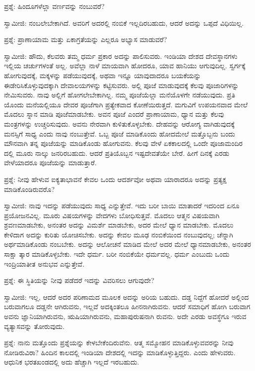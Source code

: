ಪ್ರಶ್ನೆ: ಹಿಂದೂಗಳೆಲ್ಲಾ ವರ್ಣವನ್ನು ನಂಬುವರೆ?

ಸ್ವಾಮೀಜಿ: ನಂಬಲೇಬೇಕಾಗಿದೆ. ಅವರಿಗೆ ಅದರಲ್ಲಿ ನಂಬಿಕೆ ಇಲ್ಲದಿರಬಹುದು, ಆದರೆ ಅದನ್ನು ಒಪ್ಪದೆ ವಿಧಿಯಿಲ್ಲ.

ಪ್ರಶ್ನೆ: ಪ್ರಾಣಾಯಾಮ ಮತ್ತು ಏಕಾಗ್ರತೆಯನ್ನು ಎಲ್ಲರೂ ಅಭ್ಯಾಸ ಮಾಡುವರೆ?

ಸ್ವಾಮೀಜಿ: ಹೌದು, ಕೆಲವರು ತಮ್ಮ ಧರ್ಮ ಪ್ರಕಾರ ಅದನ್ನು ಪಾಲಿಸುವರು. ಇಂಡಿಯಾ ದೇಶದ ದೇವಸ್ಥಾನಗಳು ಇಲ್ಲಿಯ ಚರ್ಚುಗಳಂತೆ ಅಲ್ಲ. ಅವೆಲ್ಲಾ ನಾಳೆ ಮಾಯವಾಗಿ ಹೋದರೂ, ಯಾವ ಹಾನಿಯು ಆಗುವುದಿಲ್ಲ. ಸ್ವರ್ಗಕ್ಕೆ ಹೋಗುವುದಕ್ಕೆ, ಮಕ್ಕಳನ್ನು ಪಡೆಯುವುದಕ್ಕೆ, ಅಥವಾ ಇನ್ನೂ ಯಾವುದಾದರೂ ಬಯಕೆಯನ್ನು ಈಡೇರಿಸಿಕೊಳ್ಳುವುದಕ್ಕಾಗಿ ದೇವಾಲಯಗಳನ್ನು ಕಟ್ಟಿಸುವರು. ಅಲ್ಲಿ ಪೂಜೆ ಮಾಡುವುದಕ್ಕೆ ಕೆಲವು ಪೂಜಾರಿಗಳನ್ನು ನೇಮಿಸುವರು. ನಾವು ಅಲ್ಲಿಗೆ ಹೋಗಲೇಬೇಕಾಗಿಲ್ಲ. ನಮ್ಮ ಪೂಜೆಯೆಲ್ಲಾ ಮನೆಯೊಳಗೇ ನಡೆಯುವುದು. ಪ್ರತಿ ಯೊಂದು ಮನೆಯಲ್ಲಿಯೂ ದೇವರ ಪೂಜೆಗಾಗಿ ಪ್ರತ್ಯೇಕವಾದ ಕೋಣೆಯಿರುತ್ತದೆ. ಮಗುವಿಗೆ ಉಪಯನವಾದ ಮೇಲೆ ಮೊದಲು ಸ್ನಾನ ಮಾಡಿ ಪೂಜೆಮಾಡಬೇಕು. ಅವನ ಪೂಜೆ ಎಂದರೆ ಪ್ರಾಣಾಯಾಮ, ಧ್ಯಾನ ಮತ್ತು ಕೆಲವು ಮಂತ್ರಗಳನ್ನು ಉಚ್ಚರಿಸುವುದು. ಅವನು ನೇರವಾಗಿ ಕುಳಿತುಕೊಳ್ಳಬೇಕು. ದೇಹವನ್ನು ಆರೋಗ್ಯ ವಾಗಿಡುವುದಕ್ಕೆ ಮನಸ್ಸಿಗೆ ಸಾಧ್ಯ ಎಂದು ನಾವು ನಂಬುತ್ತೇವೆ. ಒಬ್ಬ ಪೂಜೆ ಮಾಡಿಕೊಂದು ಹೋದಮೇಲೆ ಮತ್ತೊಬ್ಬನು ಬಂದು ಮೌನವಾಗಿ ತನ್ನ ಪೂಜೆಯನ್ನು ಮಾಡಿಕೊಂಡು ಹೋಗುವನು. ಕೆಲವು ವೇಳೆ ಏಕಕಾಲದಲ್ಲಿ ಒಂದೇ ಪೂಜಾಮಂದಿರ ದಲ್ಲಿ ಮೂರು ನಾಲ್ಕು ಜನರಿರಬಹುದು. ಆದರೆ ಪ್ರತಿಯೊಬ್ಬನ ಇಷ್ಟದೇವತೆಯೇ ಬೇರೆ. ಹೀಗೆ ದಿನಕ್ಕೆ ಎರಡು ವೇಳೆಯಾದರೂ ಪೂಜೆಯನ್ನು ಮಾಡುತ್ತಾರೆ.

ಪ್ರಶ್ನೆ: ನೀವು ಹೇಳುವ ಐಕ್ಯತಾಭಾವನೆ ಕೇವಲ ಒಂದು ಆದರ್ಶವೋ ಅಥವಾ ಯಾರಾದರೂ ಅದನ್ನು ಪ್ರತ್ಯಕ್ಷ ಮಾಡಿಕೊಂಡಿರುವರೊ?

ಸ್ವಾಮೀಜಿ: ನಾವು ಇದನ್ನು ಪಡೆಯುವುದು ಸಾಧ್ಯ ಎನ್ನುತ್ತೇವೆ. ಇದು ಬರೀ ಬಾಯಿ ಮಾತಾದರೆ ಇದರಿಂದ ಏನೂ ಪ್ರಯೋಜನವಿಲ್ಲ. ಮೂರು ವಿಷಯಗಳನ್ನು ವೇದಗಳು ಬೋಧಿಸುತ್ತವೆ. ಮೊದಲು ಆತ್ಮನ ವಿಷಯವಾಗಿ ಶ್ರವಣಮಾಡಬೇಕು, ಅನಂತರ ಅದನ್ನು ವಿಮರ್ಶೆ ಮಾಡಬೇಕು, ಅದರ ಮೇಲೆ ಧ್ಯಾನ ಮಾಡಬೇಕು. ಮೊದಲು ಕೇಳಿದಾಗ ಅದನ್ನು ಕುರಿತು ಯೋಚಿಸಬೇಕು. ಅದನ್ನು ಕೇವಲ ಮೂಢ ನಂಬಿಕೆಯಿಂದ ನಂಬುವುದಲ್ಲ; ಚೆನ್ನಾಗಿ ಅರ್ಥಮಾಡಿಕೊಂಡು ನಂಬಬೇಕು. ಅದನ್ನು ಆಲೋಚನೆ ಮಾಡಿದ ಮೇಲೆ ಅದರ ಮೇಲೆ ಧ್ಯಾನಮಾಡಬೇಕು, ಅನಂತರ ಸಾಕ್ಷಾ ತ್ಕಾರ ಮಾಡಿಕೊಳ್ಳಬೇಕು. ಇದೇ ಧರ್ಮ. ಬರೀ ನಂಬಿಕೆಯೇ ಧರ್ಮವಲ್ಲ. ಧರ್ಮ ಎಂಬುದು ಒಂದು ಇಂದ್ರಿಯಾತೀತ ಅನುಭವ ಎನ್ನುತ್ತೇವೆ.

ಪ್ರಶ್ನೆ: ಈ ಸ್ಥಿತಿಯನ್ನು ನೀವು ಪಡೆದರೆ ಇದನ್ನು ವಿವರಿಸಲು ಆಗುವುದೇ?

ಸ್ವಾಮೀಜಿ: ಇಲ್ಲ, ಆದರೆ ಅದರ ಪರಿಣಾಮದ ಮೂಲಕ ಅದನ್ನು ಅರಿಯ ಬಹುದು. ದಡ್ಡ ನಿದ್ದೆಗೆ ಹೋದರೆ ಅಲ್ಲಿಂದ ಬರುವಾಗಲೂ ದಡ್ಡನೇ ಆಗಿರುವನು, ಇಲ್ಲವೆ ಅದಕ್ಕಿಂತಲೂ ಹೀನನಾಗಿರುವನು. ಆದರೆ ಸಮಾಧಿಗೆ ಹೋಗಿ ಬರುವಾಗ ಅವನು ಜ್ಞಾನಿಯಾಗಿರುವನು, ಋಷಿಯಾಗಿರುವನು, ಮಹಾಪುರುಷನಾಗಿ ರುವನು. ಅದೇ ಎರಡು ಅವಸ್ಥೆಗೂ ಇರುವ ವ್ಯತ್ಯಾಸವನ್ನು ತೋರುವುದು.

ಪ್ರಶ್ನೆ: ನಾನು ಮತ್ತೊಂದು ಪ್ರಶ್ನೆಯನ್ನು ಕೇಳಬೇಕೆಂದಿರುವೆನು. ಆತ್ಮ ಸಮ್ಮೋಹನ  ಮಾಡಿಕೊಳ್ಳುವವರನ್ನು ನೀವು ನೋಡಿರುವಿರಾ? ಹಿಂದಿನ ಕಾಲದಲ್ಲಿ ಇಂಡಿಯಾ ದೇಶದಲ್ಲಿ ಇದನ್ನು ಮಾಡಿಕೊಳ್ಳುತ್ತಿದ್ದರು. ಎಂದು ಹೇಳುವರು. ಆಧುನಿಕ ಭರತಖಂಡದಲ್ಲಿ ಅದು ಹೆಚ್ಚಾಗಿ ಇಲ್ಲದೆ ಇರಬಹುದು.

